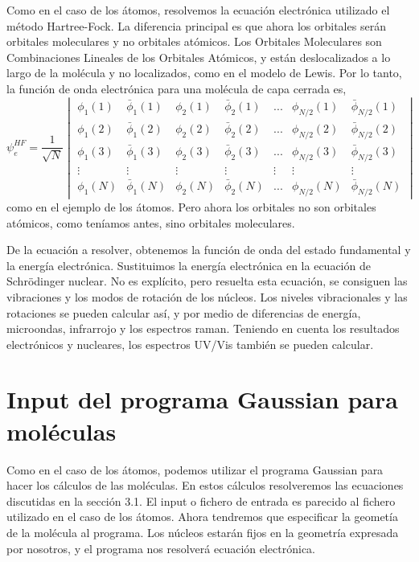 \documentclass{tufte-book}
\begin{document}
Como en el caso de los átomos, resolvemos la ecuación electrónica utilizado el método Hartree-Fock. La diferencia principal es que ahora los orbitales serán orbitales moleculares y no orbitales atómicos. Los Orbitales Moleculares son Combinaciones Lineales de los Orbitales Atómicos, y están deslocalizados a lo largo de la molécula y no localizados, como en el modelo de Lewis. Por lo tanto, la función de onda electrónica para una molécula de capa cerrada es,
\begin{equation}
    \psi_e^{HF}=\frac{1}{\sqrt{N}} 
    \begin{vmatrix}
    \phi_1(1) & \bar{\phi}_1(1) & \phi_2(1) & \bar{\phi}_2(1)& ...& \phi_{N/2}(1) & \bar{\phi}_{N/2}(1)\\ 
    \phi_1(2) & \bar{\phi}_1(2) & \phi_2(2) & \bar{\phi}_2(2)& ...& \phi_{N/2}(2) & \bar{\phi}_{N/2}(2) \\
    \phi_1(3) & \bar{\phi}_1(3) & \phi_2(3) & \bar{\phi}_2(3)& ...& \phi_{N/2}(3) & \bar{\phi}_{N/2}(3) \\
    \vdots & \vdots &\vdots &\vdots &\vdots &\vdots &\vdots \\
    \phi_1(N) & \bar{\phi}_1(N) & \phi_2(N) & \bar{\phi}_2(N)& ...& \phi_{N/2}(N) & \bar{\phi}_{N/2}(N)
    \end{vmatrix}
\end{equation}
como en el ejemplo de los átomos. Pero ahora los orbitales no son orbitales atómicos, como teníamos antes, sino orbitales moleculares. 

De la ecuación a resolver, obtenemos la función de onda del estado fundamental y la energía electrónica. Sustituimos la energía electrónica en la ecuación de Schrödinger nuclear. No es explícito, pero resuelta esta ecuación, se consiguen las vibraciones y los modos de rotación de los núcleos. Los niveles vibracionales y las rotaciones se pueden calcular así, y por medio de diferencias de energía, microondas, infrarrojo y los espectros raman. Teniendo en cuenta los resultados electrónicos y nucleares, los espectros UV/Vis también se pueden calcular.

\section{Input del programa Gaussian para moléculas}
Como en el caso de los átomos, podemos utilizar el programa Gaussian para hacer los cálculos de las moléculas. En estos cálculos resolveremos las ecuaciones discutidas en la sección 3.1. El input o fichero de entrada es parecido al fichero utilizado en el caso de los átomos. Ahora tendremos que especificar la geometía de la molécula al programa. Los núcleos estarán fijos en la geometría expresada por nosotros, y el programa nos resolverá ecuación electrónica.
\end{document}
